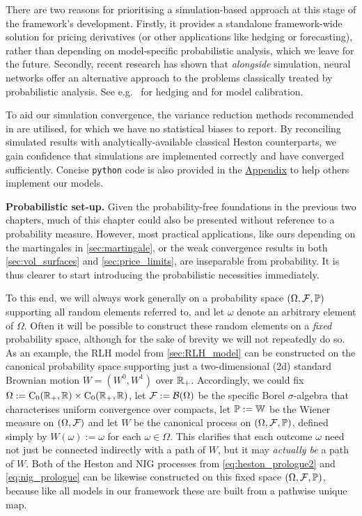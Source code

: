 There are two reasons for prioritising a simulation-based approach at this stage of the framework's development. Firstly, it provides a standalone framework-wide solution for pricing derivatives (or other applications like hedging or forecasting), rather than depending on model-specific probabilistic analysis, which we leave for the future. Secondly, recent research has shown that \emph{alongside} simulation, neural networks offer an alternative approach to the problems classically treated by probabilistic analysis. See e.g.~\cite{buehler_2019} for hedging and \cite{horvath_2021} for model calibration.

To aid our simulation convergence, the variance reduction methods recommended in \cite{mccrickerd_2018} are utilised, for which we have no statistical biases to report. By reconciling simulated results with analytically-available classical Heston counterparts, we gain confidence that simulations are implemented correctly and have converged sufficiently.
Concise \texttt{python} code is also provided in the \hyperlink{appendix}{Appendix} to help others implement our models.

\vspace{3mm}\textbf{Probabilistic set-up.} Given the probability-free foundations in the previous two chapters, much of this chapter could also be presented without reference to a probability measure. However, most practical applications, like ours depending on the martingales in \autoref{sec:martingale}, or the weak convergence results in both \autoref{sec:vol_surfaces} and \autoref{sec:price_limits}, are inseparable from probability. It is thus clearer to start introducing the probabilistic necessities immediately.

To this end, we will always work generally on a probability space $(\Omega,\mathcal{F},\mathbb{P})$ supporting all random elements referred to, and let $\omega$ denote an arbitrary element of $\Omega$. Often it will be possible to construct these random elements on a \emph{fixed} probability space, although for the sake of brevity we will not repeatedly do so. As an example, the RLH model from \autoref{sec:RLH_model} can be constructed on the canonical probability space supporting just a two-dimensional (2d) standard Brownian motion $W=(W^0,W^1)$ over $\mathbb{R}_+$. Accordingly, we could fix $\Omega:=\mathrm{C}_0(\mathbb{R}_+,\mathbb{R})\times\mathrm{C}_0(\mathbb{R}_+,\mathbb{R})$, let $\mathcal{F}:=\mathcal{B}(\Omega)$ be the specific Borel $\sigma$-algebra that characterises uniform convergence over compacts, let $\mathbb{P}:=\mathbb{W}$ be the Wiener measure on $(\Omega,\mathcal{F})$ and let $W$ be the canonical process on $(\Omega,\mathcal{F},\mathbb{P})$, defined simply by $W(\omega):=\omega$ for each $\omega\in\Omega$. This clarifies that each outcome $\omega$ need not just be connected indirectly with a path of $W$, but it may \emph{actually be} a path of $W$. Both of the Heston and NIG processes from \autoref{eq:heston_prologue2} and \autoref{eq:nig_prologue} can be likewise constructed on this fixed space $(\Omega,\mathcal{F},\mathbb{P})$, because like all models in our framework these are built from a pathwise unique map.

